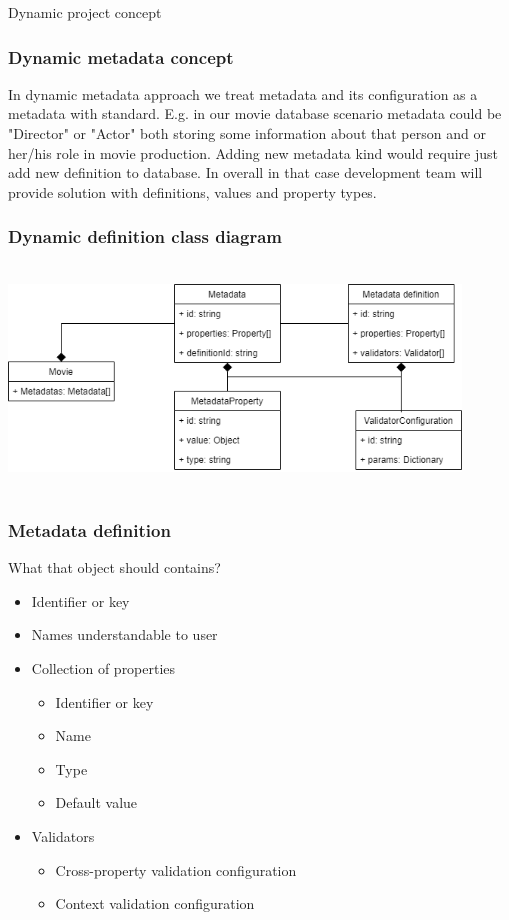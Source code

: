 \documentclass{beamer}
\begin{document}
\begin{section}{Dynamic project concept}

\begin{frame}
\frametitle{Dynamic metadata concept}

In dynamic metadata approach we treat metadata and its configuration as a metadata with standard. E.g. in our movie database scenario metadata could be "Director" or "Actor" both storing some information about that person and \/ or her/his role in movie production. Adding new metadata kind would require just add new definition to database. 
\newline
\newline
In overall in that case development team will provide solution with definitions, values and property types. 

\end{frame}

\begin{frame}
\frametitle{Dynamic definition class diagram}
\centering
 \includegraphics[width=12cm, height=6cm]{Dynamic.png}
\end{frame}

\begin{frame}
\frametitle{Metadata definition}

What that object should contains?\\

\begin{itemize}
	\item Identifier or key
	\item Names understandable to user
	\item Collection of properties
		\begin{itemize}
			\item Identifier or key
			\item Name
			\item Type
			\item Default value
		\end{itemize}
	\item Validators
		\begin{itemize}
			\item Cross-property validation configuration
			\item Context validation configuration
		\end{itemize}
\end{itemize}


\end{frame}
\end{section}
\end{document}
